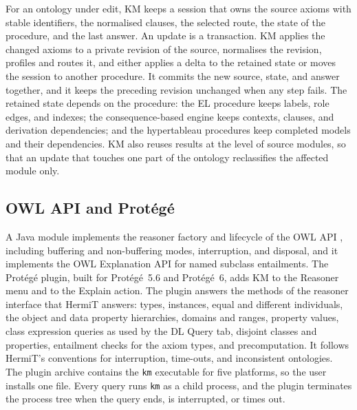 For an ontology under edit, KM keeps a session that owns the source axioms
with stable identifiers, the normalised clauses, the selected route, the state
of the procedure, and the last answer.  An update is a transaction.  KM applies
the changed axioms to a private revision of the source, normalises the
revision, profiles and routes it, and either applies a delta to the retained
state or moves the session to another procedure.  It commits the new source,
state, and answer together, and it keeps the preceding revision unchanged when
any step fails.  The retained state depends on the procedure: the EL
procedure keeps labels, role edges, and indexes; the consequence-based engine
keeps contexts, clauses, and derivation dependencies; and the hypertableau
procedures keep completed models and their dependencies.  KM also reuses
results at the level of source modules, so that an update that touches one
part of the ontology reclassifies the affected module only.

\subsection{OWL API and Prot\'eg\'e}

A Java module implements the reasoner factory and lifecycle of the OWL API
\cite{horridge2011owlapi}, including buffering and non-buffering modes,
interruption, and disposal, and it implements the OWL Explanation API for
named subclass entailments.  The Prot\'eg\'e plugin, built for Prot\'eg\'e~5.6
and Prot\'eg\'e~6, adds KM to the Reasoner menu and to the Explain action.  The
plugin answers the methods of the reasoner interface that HermiT answers:
types, instances, equal and different individuals, the object and data
property hierarchies, domains and ranges, property values, class expression
queries as used by the DL Query tab, disjoint classes and properties,
entailment checks for the axiom types, and precomputation.  It follows
HermiT's conventions for interruption, time-outs, and inconsistent ontologies.
The plugin archive contains the \texttt{km} executable for five platforms, so
the user installs one file.  Every query runs \texttt{km} as a child process,
and the plugin terminates the process tree when the query ends, is
interrupted, or times out.
